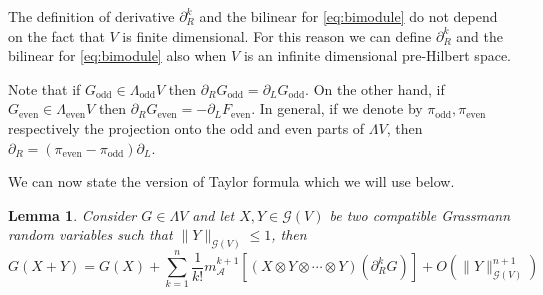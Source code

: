 \documentclass{article}
\newcommand{\tmop}[1]{\ensuremath{\operatorname{#1}}}
\newtheorem{lemma}[theorem]{Lemma}
\begin{document}
\begin{remark}
  \label{remark_infinitederivative}The definition of derivative $\partial_R^k$
  and the bilinear for {\eqref{eq:bimodule}} do not depend on the fact that
  $V$ is finite dimensional. For this reason we can define $\partial_R^k$ and
  the bilinear for {\eqref{eq:bimodule}} also when $V$ is an infinite
  dimensional pre-Hilbert space.
\end{remark}

\begin{remark}
  Note that if $G_{\tmop{odd}} \in \Lambda_{\tmop{odd}} V$ then $\partial_R
  G_{\tmop{odd}} = \partial_L G_{\tmop{odd}}$. On the other hand, if
  $G_{\tmop{even}} \in \Lambda_{\tmop{even}} V$ then $\partial_R
  G_{\tmop{even}} = - \partial_L F_{\tmop{even}}$. In general, if we denote by
  $\pi_{\tmop{odd}}, \pi_{\tmop{even}}$ respectively the projection onto the
  odd and even parts of $\Lambda V$, then $\partial_R = (\pi_{\tmop{even}} -
  \pi_{\tmop{odd}}) \partial_L$.
\end{remark}

We can now state the version of Taylor formula which we will use below.

\begin{lemma}
  \label{lemma:taylor}Consider $G \in \Lambda V$ and let $X, Y \in \mathcal{G}
  (V)$ be two compatible Grassmann random variables such that $\| Y
  \|_{\mathcal{G} (V)} \leqslant 1$, then
  \begin{equation}
    G (X + Y) = G (X) + \sum_{k = 1}^n \frac{1}{k!} m_{\mathcal{A}}^{k + 1}
    [(X \otimes Y \otimes \cdots \otimes Y) (\partial_R^k G)] + O (\| Y \|^{n
    + 1}_{\mathcal{G} (V)}) \label{eq:taylor}
  \end{equation}
\end{lemma}
\end{document}
